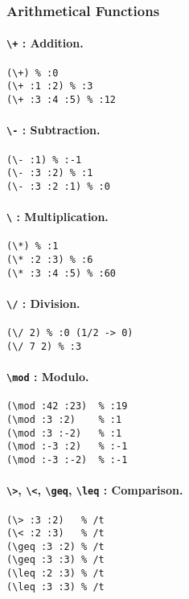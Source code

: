 \documentclass[10pt,a4paper]{article}
\newcommand{\pT}[1]{\textbf{\texttt{\textbackslash #1}}}
\begin{document}
\subsubsection{Arithmetical Functions}

\paragraph{\pT{+} : Addition.}
\begin{verbatim}
(\+) % :0
(\+ :1 :2) % :3
(\+ :3 :4 :5) % :12
\end{verbatim}

\paragraph{\pT{-} : Subtraction.}
\begin{verbatim}
(\- :1) % :-1
(\- :3 :2) % :1
(\- :3 :2 :1) % :0
\end{verbatim}

\paragraph{\pT{*} : Multiplication.}
\begin{verbatim}
(\*) % :1
(\* :2 :3) % :6
(\* :3 :4 :5) % :60
\end{verbatim}

\paragraph{\pT{/} : Division.}
\begin{verbatim}
(\/ 2) % :0 (1/2 -> 0)
(\/ 7 2) % :3
\end{verbatim}

\paragraph{\pT{mod} : Modulo.}
\begin{verbatim}
(\mod :42 :23)  % :19
(\mod :3 :2)    % :1
(\mod :3 :-2)   % :1
(\mod :-3 :2)   % :-1
(\mod :-3 :-2)  % :-1
\end{verbatim}

\paragraph{\pT{>}, \pT{<}, \pT{geq}, \pT{leq} : Comparison.}
\begin{verbatim}
(\> :3 :2)   % /t
(\< :2 :3)   % /t
(\geq :3 :2) % /t
(\geq :3 :3) % /t
(\leq :2 :3) % /t
(\leq :3 :3) % /t
\end{verbatim}
\end{document}
